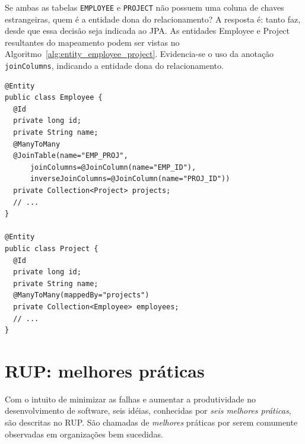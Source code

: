 \documentclass[
  10.5pt,				  %
	openright,			%
	twoside,			  %
  a5paper,
  chapter=TITLE,	%
	section=TITLE,	%
  hyphens,        %
	english,        %
	brazil          %
]{abntex2}
\begin{document}
Se ambas as tabelas \texttt{EMPLOYEE} e \texttt{PROJECT} não possuem uma coluna de chaves estrangeiras, quem é a entidade dona do relacionamento? A resposta é: tanto faz, desde que essa decisão seja indicada ao JPA. As entidades Employee e Project resultantes do mapeamento podem ser vistas no Algoritmo~\ref{alg:entity_employee_project}. Evidencia-se o uso da anotação \texttt{joinColumns}, indicando a entidade dona do relacionamento.


\begin{lstlisting}[caption={Classes Employee e Project.}, label={alg:entity_employee_project}]
@Entity
public class Employee {
  @Id
  private long id;
  private String name;
  @ManyToMany
  @JoinTable(name="EMP_PROJ",
      joinColumns=@JoinColumn(name="EMP_ID"),
      inverseJoinColumns=@JoinColumn(name="PROJ_ID"))
  private Collection<Project> projects;
  // ...
}

@Entity
public class Project {
  @Id
  private long id;
  private String name;
  @ManyToMany(mappedBy="projects")
  private Collection<Employee> employees;
  // ...
}
\end{lstlisting}
%



\chapter{RUP: melhores práticas}\label{anexo:rup}

Com o intuito de minimizar as falhas e aumentar a produtividade no desenvolvimento de software, seis idéias, conhecidas por \emph{seis melhores práticas}, são descritas no RUP. São chamadas de \emph{melhores} práticas por serem comumente observadas em organizações bem sucedidas.
\end{document}
